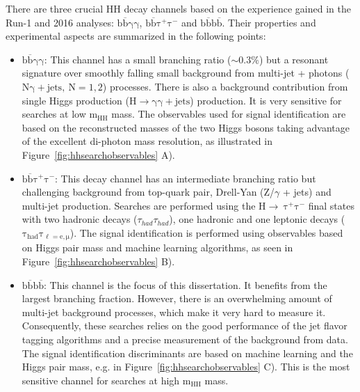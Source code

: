 There are three crucial HH decay channels based on the experience gained in the Run-1 and 2016 analyses: $\mathrm{b\overline{b}\gamma\gamma}$, $\mathrm{b\overline{b}\tau^{+}\tau^{-}}$ and $\mathrm{b\overline{b}b\overline{b}}$. Their properties and experimental aspects are summarized in the following points:
\begin{itemize}
\item $\mathrm{b\overline{b}\gamma\gamma}$: This channel has a small branching ratio ($\sim0.3\%$) but a resonant signature over smoothly falling small background from multi-jet + photons ($\mathrm{N\gamma + jets,~N=1,2}$) processes. There is also a background contribution from single Higgs production ($\mathrm{H\rightarrow\gamma\gamma + jets}$) production. It is very sensitive for searches at low $\mathrm{m_{HH}}$ mass. The observables used for signal identification are based on the reconstructed masses of the two Higgs bosons taking advantage of the excellent di-photon mass resolution, as illustrated in Figure~\ref{fig:hhsearchobservables} A).
\item $\mathrm{b\overline{b}\tau^{+}\tau^{-}}$: This decay channel has an intermediate branching ratio but challenging background from top-quark pair, Drell-Yan (Z/$\gamma$ + jets) and multi-jet production. Searches are performed using the $\mathrm{H\rightarrow~\tau^{+}\tau^{-}}$ final states with two hadronic decays ($\tau_{had}\tau_{had}$), one hadronic and one leptonic decays ($\mathrm{\tau_{had}\tau_{\ell=e,\mu}}$). The signal identification is performed using observables based on Higgs pair mass and machine learning algorithms, as seen in Figure~\ref{fig:hhsearchobservables} B).
\item $\mathrm{b\overline{b}b\overline{b}}$: This channel is the focus of this dissertation. It benefits from the largest branching fraction. However, there is an overwhelming amount of multi-jet background processes, which make it very hard to measure it. Consequently, these searches relies on the good performance of the jet flavor tagging algorithms and a precise measurement of the background from data. The signal identification discriminants are based on machine learning and the Higgs pair mass, e.g. in Figure~\ref{fig:hhsearchobservables} C). This is the most sensitive channel for searches at high $\mathrm{m_{HH}}$ mass. 
\end{itemize}

